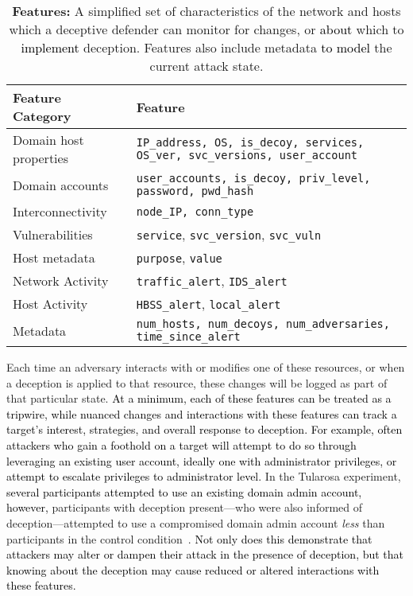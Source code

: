 \documentclass{article}
\newcommand\mmm[1]{\textcolor{black}{#1}}
\newcommand\nnn[1]{\textcolor{black}{#1}}
\begin{document}
\bgroup
\def\arraystretch{1.5}
\begin{table}[!htb] \small
	\begin{tabular}{ | p{} | p{} | }
		\hline
		\small
		\cellcolor{ltgray} Feature Category & \cellcolor{ltgray}Feature \\ \hline
		Domain host properties & \texttt{IP\_address, OS, is\_decoy, services, OS\_ver, svc\_versions, user\_account}\\ \hline
		Domain accounts & \texttt{user\_accounts, is\_decoy, priv\_level, password, pwd\_hash} \\ \hline
		Interconnectivity & \texttt{node\_IP, conn\_type} \\ \hline
		Vulnerabilities & \texttt{service}, \texttt{svc\_version}, \texttt{svc\_vuln}  \\ \hline
		Host metadata & \texttt{purpose}, \texttt{value}  \\ \hline
		Network Activity	& \texttt{traffic\_alert}, \texttt{IDS\_alert} \\ \hline
		Host Activity	& \texttt{HBSS\_alert}, \texttt{local\_alert} \\ \hline
		Metadata	& \texttt{num\_hosts, num\_decoys, num\_adversaries, time\_since\_alert} \\ \hline
	\end{tabular}
	\caption{\textbf{Features:} A simplified set of characteristics of the network and hosts which a deceptive defender can monitor for changes, or \mmm{about} which to \mmm{implement} deception. Features also include metadata \mmm{to model} the current attack state.} 
	\label{table:features}
\end{table}
\egroup

Each time an adversary interacts with or modifies one of these resources, or when a deception is applied to that resource, these changes will be logged as part of that particular state. 
\nnn{At a minimum, each of these features can be treated as a tripwire, while nuanced changes and interactions with these features can track a target's interest, strategies, and overall response to deception.} 
\mmm{For example, often attackers who gain a foothold on a target will attempt to do so through leveraging an existing user account, ideally one with administrator privileges, or attempt to escalate privileges to administrator level.} In the Tularosa experiment, \mmm{several participants attempted to use an existing domain admin account, however,} participants with deception present---who were also informed of deception---attempted to use a compromised domain admin account \textit{less} than participants in the control condition~\cite{usenix-2021}. \mmm{Not only does this demonstrate that attackers may alter or dampen their attack in the presence of deception, but that knowing about the deception may cause reduced or altered interactions \nnn{with these features}.} 
	
\end{document}
